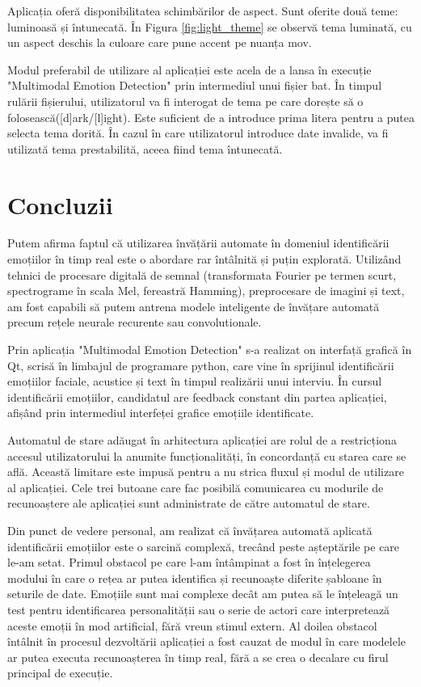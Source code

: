 \documentclass[a4paper, 12pt]{report}
\begin{document}
	Aplicația oferă disponibilitatea schimbărilor de aspect. Sunt oferite două teme: luminoasă și întunecată. În Figura \ref{fig:light_theme} se observă tema luminată, cu un aspect deschis la culoare care pune accent pe nuanța mov.

	Modul preferabil de utilizare al aplicației este acela de a lansa în execuție "Multimodal Emotion Detection" prin intermediul unui fișier bat. În timpul rulării fișierului, utilizatorul va fi interogat de tema pe care dorește să o folosească([d]ark/[l]ight). Este suficient de a introduce prima litera pentru a putea selecta tema dorită. În cazul în care utilizatorul introduce date invalide, va fi utilizată tema prestabilită, aceea fiind tema întunecată.

	\clearpage
	\section{Concluzii}
	Putem afirma faptul că utilizarea învățării automate în domeniul identificării emoțiilor în timp real este o abordare rar întâlnită și puțin explorată. Utilizând tehnici de procesare digitală de semnal (transformata Fourier pe termen scurt, spectrograme în scala Mel, fereastră Hamming), preprocesare de imagini și text, am fost capabili să putem antrena modele inteligente de învățare automată precum rețele neurale recurente sau convolutionale.

	Prin aplicația "Multimodal Emotion Detection" s-a realizat on interfață grafică în Qt, scrisă în limbajul de programare python, care vine în sprijinul identificării emoțiilor faciale, acustice și text în timpul realizării unui interviu. În cursul identificării emoțiilor, candidatul are feedback constant din partea aplicației, afișând prin intermediul interfeței grafice emoțiile identificate. 

	Automatul de stare adăugat în arhitectura aplicației are rolul de a restricționa accesul utilizatorului la anumite funcționalități, în concordanță cu starea care se află. Această limitare este impusă pentru a nu strica fluxul și modul de utilizare al aplicației. Cele trei butoane care fac posibilă comunicarea cu modurile de recunoaștere ale aplicației sunt administrate de către automatul de stare.

	Din punct de vedere personal, am realizat că învățarea automată aplicată identificării emoțiilor este o sarcină complexă, trecând peste așteptările pe care le-am setat. Primul obstacol pe care l-am întâmpinat a fost în înțelegerea modului în care o rețea ar putea identifica și recunoaște diferite șabloane în seturile de date. Emoțiile sunt mai complexe decât am putea să le înțeleagă un test pentru identificarea personalității sau o serie de actori care interpretează aceste emoții în mod artificial, fără vreun stimul extern. Al doilea obstacol întâlnit în procesul dezvoltării aplicației a fost cauzat de modul în care modelele ar putea executa recunoașterea în timp real, fără a se crea o decalare cu firul principal de execuție.
\end{document}
